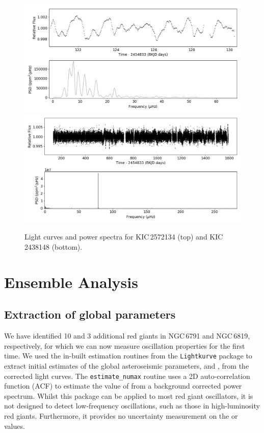\begin{figure}
    \centering
    \includegraphics[width=0.9\linewidth]{Chapter5/2572134_lc_ps.png}
    \includegraphics[width=0.9\linewidth]{Chapter5/2438148_lc_ps.png}
    \caption[Light curves and power spectra for KIC\,2572134 and KIC\,2438148]{Light curves and power spectra for KIC\,2572134 (top) and KIC\,2438148 (bottom).}
    \label{fig:weirdvars}
\end{figure}

\section{Ensemble Analysis}

\subsection{Extraction of global parameters}
We have identified 10 and 3 additional red giants in NGC\,6791 and NGC\,6819, respectively, for which we can now measure oscillation properties for the first time. We used the in-built estimation routines from the \texttt{Lightkurve} package to extract initial estimates of the global asteroseismic parameters, \numax{} and \dnu{}, from the corrected light curves. The \texttt{estimate\_numax} routine uses a 2D auto-correlation function (ACF) to estimate the value of \numax{} from a background corrected power spectrum. Whilst this package can be applied to most red giant oscillators, it is not designed to detect low-frequency oscillations, such as those in high-luminosity red giants. Furthermore, it provides no uncertainty measurement on the \numax{} or \dnu{} values.

